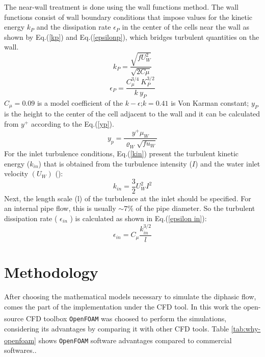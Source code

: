 \documentclass[11pt]{report}
\newcommand{\openfoam}{\texttt{Open}\nolinebreak\hspace{-.2em}{\color{blue}\Large$\nabla$}\nolinebreak\hspace{-.2em}\texttt{FOAM}\textsuperscript{\textregistered}\xspace}
\begin{document}
The near-wall treatment is done using the wall functions method. 
%
The wall functions consist of wall boundary conditions that impose values for the kinetic energy $k_{P}$ and the dissipation rate $\epsilon_{P}$  in the center of the cells near the wall as shown by Eq.(\ref{kp}) and Eq.(\ref{epsilonp}), which bridges turbulent quantities on the wall.
%
\begin{equation}
k_{P} =\frac{\sqrt{f {U_{W}^2 }}}{\sqrt{2 C\mu }}
\label{kp}
\end{equation}
%
\begin{equation}
\epsilon_{P} =\frac{C^{3/4}_{\mu } \ K^{3/2}_{P}}{k\ y_{P}}
\label{epsilonp}
\end{equation}
\(C_{\mu}=0.09\) is a model coefficient of the \(k-\epsilon\);\quad $k=0.41$ is Von Karman constant; 
%
$y_{P}$ is the height to the center of the cell adjacent to the wall and it can be calculated from $y^+$ according to the Eq.(\ref{yp}).
%
\begin{equation}
y_{p}=\frac{y^{+} \mu_W}{\varrho_W\sqrt{f u_{W}}}
\label{yp}
\end{equation}
%
For the inlet turbulence conditions, Eq.(\ref{kin}) present the turbulent kinetic energy (\(k_{in}\)) that is obtained from the turbulence intensity (\(I\)) and the water inlet velocity \((U_W)\) (\citet{Messa-2020}):
%
\begin{equation}
k_{in} =\frac{3}{2} U_W^{2} I^{2} 
\label{kin}
\end{equation}
%
Next, the length scale (l) of the turbulence at the inlet should be specified. 
%
For an internal pipe flow, this is usually \(\sim 7 \%\) of the pipe diameter. So the turbulent dissipation rate ( \(\epsilon_{in}\) ) is calculated as shown in Eq.(\ref{epsilon in}): 
%
\begin{equation}
\epsilon_{in}=C_{\mu} \frac{k_{in}^{3 / 2}}{l} 
\label{epsilon in}
\end{equation}
%
\section{Methodology}
%
After choosing the mathematical models necessary to simulate the diphasic flow, comes the part of the implementation under the CFD tool. 
%
In this work the open-source CFD toolbox \openfoam was choosed to perform the simulations, considering its advantages by comparing it with other CFD tools.
%
Table \ref{tab:why-openfoam} shows \openfoam software advantages compared to commercial softwares..\\
\end{document}
